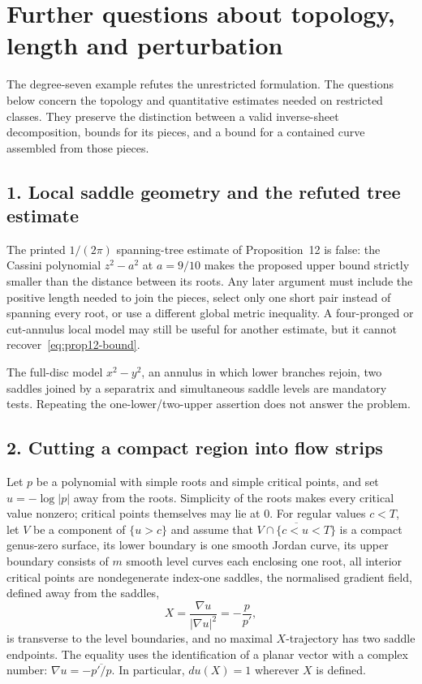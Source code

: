 \documentclass[11pt]{article}
\begin{document}
\section{Further questions about topology, length and perturbation}\label{sec:open}

The degree-seven example refutes the unrestricted formulation. The
questions below concern the topology and quantitative estimates needed
on restricted classes. They preserve the distinction between a valid
inverse-sheet decomposition, bounds for its pieces, and a bound for a
contained curve assembled from those pieces.

\subsection*{1. Local saddle geometry and the refuted tree estimate}

\begin{problem}\label{prob:saddle1041}
The printed $1/(2\pi)$ spanning-tree estimate of Proposition~12 is false: the
Cassini polynomial $z^2-a^2$ at $a=9/10$ makes the proposed upper bound
strictly smaller than the distance between its roots. Any later argument must
include the positive length needed to join the pieces, select only one short
pair instead of spanning every root, or use a different global metric inequality.  A four-pronged or
cut-annulus local model may still be useful for another estimate, but it cannot
recover~\eqref{eq:prop12-bound}.
\end{problem}

The full-disc model $x^2-y^2$, an annulus in which lower branches rejoin, two
saddles joined by a separatrix and simultaneous saddle levels are mandatory
tests.  Repeating the one-lower/two-upper assertion does not answer the
problem.

\subsection*{2. Cutting a compact region into flow strips}

Let $p$ be a polynomial with simple roots and simple critical points, and
set $u=-\log|p|$ away from the roots. Simplicity of the roots makes every
critical value nonzero; critical points themselves may lie at $0$.
For regular values $c<T$, let $V$ be a component of $\{u>c\}$ and assume that
$\overline{V\cap\{c<u<T\}}$ is a compact genus-zero surface, its lower
boundary is one smooth Jordan curve, its upper boundary consists of $m$ smooth
level curves each enclosing one root, all interior critical points are nondegenerate index-one saddles,
the normalised gradient field, defined away from the saddles,
\[
 X=\frac{\nabla u}{|\nabla u|^2}=-\frac{p}{p'},
\]
is transverse to the level boundaries, and no maximal $X$-trajectory has two
saddle endpoints. The equality uses the identification of a planar vector
with a complex number: $\nabla u=-\overline{p'/p}$. In particular,
$du(X)=1$ wherever $X$ is defined.
\end{document}
